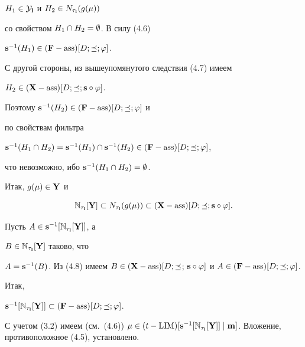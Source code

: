 \begin{pf}
${H_1} \in {{\cal Y}_{\bold l}}$ и ${H_2} \in {N_{{\tau}_{\bold l}}}(g(\mu))$


со свойством ${H_1} \cap {H_2} = \emptyset$. В силу (4.6)


${{\bold s}^{-1}}(H_1) \in ({\bold F} - {\operatorname{ass}})[D;\preceq;\varphi]$.


С другой стороны, из вышеупомянутого следствия (4.7) имеем


${H_2} \in ({\bold X} - {\operatorname{ass}})[D;\preceq;{\bold s} \circ \varphi]$.


Поэтому ${{\bold s}^{-1}}(H_2) \in ({\bold F} - {\operatorname{ass}})[D;\preceq;\varphi]$ и


по свойствам фильтра


${{\bold s}^{-1}}({H_1} \cap {H_2}) = {{\bold s}^{-1}}(H_1) \cap


{{\bold s}^{-1}}(H_2) \in ({\bold F} - {\ass})[D;\preceq;\vp]$,


что невозможно, ибо ${{\bold s}^{-1}}({H_1} \cap {H_2}) = \emptyset$.


Итак, $g(\mu) \in {\bold Y}$ и


\begin{equation}


{{\Bbb N}_{{\tau}_{\bold l}}}


[{\bold Y}] \subset {N_{{\tau}_{\bold l}}}(g(\mu))


\subset ({\bold X} - {\ass})[D;\preceq;{\bold s} \circ \vp].


\end{equation}





Пусть $A \in {{\bold s}^{-1}}[{{\Bbb N}_{{\tau}_{\bold l}}}[{\bold Y}]]$, а


$B \in {{\Bbb N}_{{\tau}_{\bold l}}}[{\bold Y}]$ таково, что


$A = {{\bold s}^{-1}}(B)$. Из (4.8) имеем $B \in ({\bold X} - {\ass})[D;


\preceq$; ${\bold s} \circ \vp]$ и $A \in ({\bold F} - {\ass})[D;\preceq;\vp]$.




Итак,


${{\bold s}^{-1}}[{{\Bbb N}_{{\tau}_{\bold l}}}[{\bold Y}]] \subset


({\bold F} - {\ass})[D;\preceq;\vp]$.


С учетом (3.2) имеем (см.~(4.6)) $\mu \in


(t - {\LIM})[{{\bold s}^{-1}}[{{\Bbb N}_{{\tau}_{\bold l}}}[{\bold Y}]] \mid


{\bold m}]$. Вложение, противоположное (4.5), установлено.


\end{pf}





